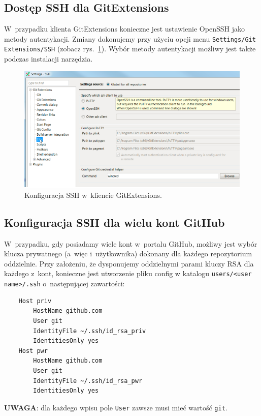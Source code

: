 \documentclass[12pt]{article}
\begin{document}
    \subsection*{Dostęp SSH dla GitExtensions}
        W~przypadku klienta GitExtensions konieczne jest ustawienie OpenSSH jako metody autentykacji. Zmiany dokonujemy przy użyciu opcji menu \texttt{Settings/Git Extensions/SSH} (zobacz rys.~\ref{fig:gitext-ssh}). Wybór metody autentykacji możliwy jest także podczas instalacji narzędzia.
        \begin{figure}
            \centering
            \includegraphics{gitextensions-ssh}
            \caption{Konfiguracja SSH w~kliencie GitExtensions.}
            \label{fig:gitext-ssh}
        \end{figure}

    \subsection*{Konfiguracja SSH dla wielu kont GitHub}\label{sec:ssh}
        W~przypadku, gdy posiadamy wiele kont w~portalu GitHub, możliwy jest wybór klucza prywatnego (a~więc i~użytkownika) dokonany dla każdego repozytorium oddzielnie. Przy założeniu, że dysponujemy oddzielnymi parami kluczy RSA dla każdego z~kont, konieczne jest utworzenie pliku config w katalogu \texttt{users/<user name>/.ssh} o~następującej zawartości:
        \begin{verbatim}
    Host priv
        HostName github.com
        User git
        IdentityFile ~/.ssh/id_rsa_priv
        IdentitiesOnly yes
    Host pwr
        HostName github.com
        User git
        IdentityFile ~/.ssh/id_rsa_pwr
        IdentitiesOnly yes
        \end{verbatim}
        \textbf{UWAGA}: dla każdego wpisu pole \texttt{User} zawsze musi mieć wartość \texttt{git}.
\end{document}
